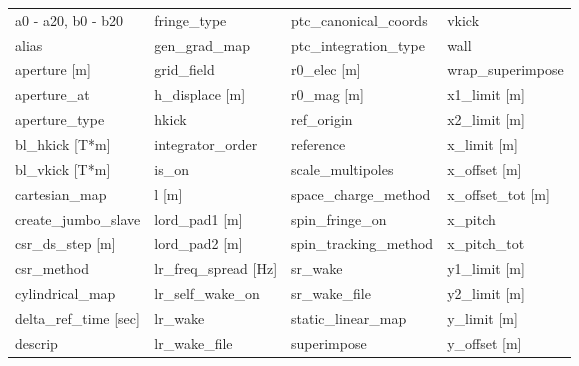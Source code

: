  \begin{tabular}{llll} \toprule
a0 - a20, b0 - b20               & fringe_type                      & ptc_canonical_coords             & vkick                            \\
alias                            & gen_grad_map                     & ptc_integration_type             & wall                             \\
aperture [m]                     & grid_field                       & r0_elec [m]                      & wrap_superimpose                 \\
aperture_at                      & h_displace [m]                   & r0_mag [m]                       & x1_limit [m]                     \\
aperture_type                    & hkick                            & ref_origin                       & x2_limit [m]                     \\
bl_hkick [T*m]                   & integrator_order                 & reference                        & x_limit [m]                      \\
bl_vkick [T*m]                   & is_on                            & scale_multipoles                 & x_offset [m]                     \\
cartesian_map                    & l [m]                            & space_charge_method              & x_offset_tot [m]                 \\
create_jumbo_slave               & lord_pad1 [m]                    & spin_fringe_on                   & x_pitch                          \\
csr_ds_step [m]                  & lord_pad2 [m]                    & spin_tracking_method             & x_pitch_tot                      \\
csr_method                       & lr_freq_spread [Hz]              & sr_wake                          & y1_limit [m]                     \\
cylindrical_map                  & lr_self_wake_on                  & sr_wake_file                     & y2_limit [m]                     \\
delta_ref_time [sec]             & lr_wake                          & static_linear_map                & y_limit [m]                      \\
descrip                          & lr_wake_file                     & superimpose                      & y_offset [m]                     \\

\end{tabular}
